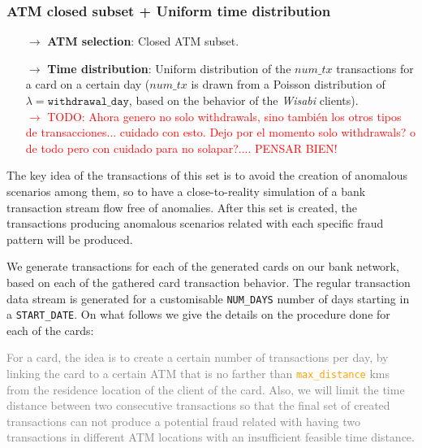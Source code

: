 \documentclass{article}
\begin{document}
\subsubsection{ATM closed subset + Uniform time distribution}

\begin{tcolorbox}
  \begin{itemize}
    \item[$\rightarrow$] \textbf{ATM selection}: Closed ATM subset.
    \item[$\rightarrow$] \textbf{Time distribution}: Uniform distribution of the $num\_tx$ transactions 
    for a card on a certain day ($num\_tx$ is drawn from a Poisson distribution of 
    $\lambda = \texttt{withdrawal\_day}$, based on the behavior of the \emph{Wisabi} clients).\\
    \textcolor{red}{$\rightarrow$ TODO: Ahora genero no solo withdrawals, sino también los otros 
    tipos de transacciones... cuidado con esto. Dejo por el momento solo withdrawals? o de todo pero con cuidado para no solapar?.... PENSAR BIEN!}
  \end{itemize}
\end{tcolorbox}

The key idea of the transactions of this set is to avoid the creation of anomalous scenarios among them, so to have a close-to-reality simulation of a bank transaction stream flow free of anomalies. After this set is created, the transactions producing anomalous scenarios related with each specific fraud pattern will be produced.


We generate transactions for each of the generated cards on our bank network, based on each of the gathered card transaction behavior. The regular transaction data stream is generated for a customisable \texttt{NUM\_DAYS} number of days starting in a \texttt{START\_DATE}. On what follows we give the details on the procedure done for each of the cards:

\textcolor{gray}{
For a card, the idea is to create a certain 
number of transactions per day, by linking the card to a certain ATM that is no farther 
than \textcolor{orange}{\texttt{max\_distance}} kms from the residence location of the 
client of the card. Also, we will limit the time distance between two consecutive 
transactions so that the final set of created transactions can not produce a potential 
fraud related with having two transactions in different ATM locations with an insufficient 
feasible time distance.
}
\end{document}
